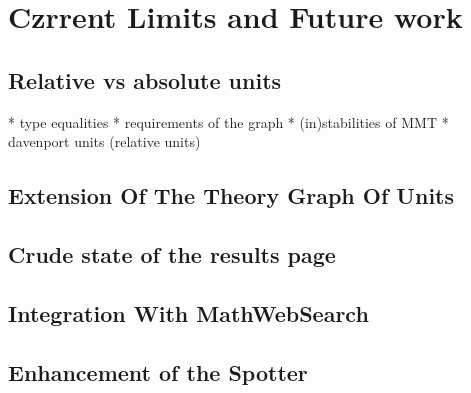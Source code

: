 \section{Czrrent Limits and Future work}
\label{sec:future}
\subsection{Relative vs absolute units}
* type equalities
* requirements of the graph
* (in)stabilities of MMT
* davenport units (relative units)

\subsection{Extension Of The Theory Graph Of Units}
\subsection{Crude state of the results page}
\label{sec:fut_res}
\subsection{Integration With MathWebSearch}
\subsection{Enhancement of the Spotter}




